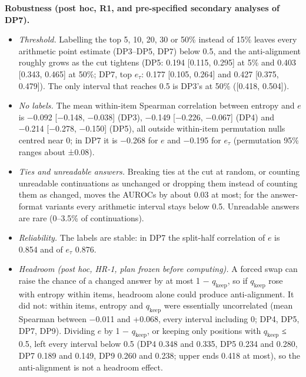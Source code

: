 \documentclass[
  10pt,
  a4paper,
]{article}
\providecommand{\tightlist}{%
  \setlength{\itemsep}{0pt}\setlength{\parskip}{0pt}}
\begin{document}
\textbf{Robustness (post hoc, R1, and pre-specified secondary analyses of DP7).}

\begin{itemize}
\tightlist
\item
  \emph{Threshold.} Labelling the top 5, 10, 20, 30 or 50\% instead of 15\% leaves every arithmetic point estimate (DP3--DP5, DP7) below 0.5, and the anti-alignment roughly grows as the cut tightens
  (DP5: 0.194 {[}0.115, 0.295{]} at 5\% and 0.403 {[}0.343, 0.465{]} at 50\%; DP7, top \(e_{\tau}\): 0.177 {[}0.105, 0.264{]} and 0.427 {[}0.375, 0.479{]}). The only interval that reaches 0.5 is DP3's
  at 50\% ({[}0.418, 0.504{]}).
\item
  \emph{No labels.} The mean within-item Spearman correlation between entropy and \(e\) is −0.092 {[}−0.148, −0.038{]} (DP3), −0.149 {[}−0.226, −0.067{]} (DP4) and −0.214 {[}−0.278, −0.150{]} (DP5),
  all outside within-item permutation nulls centred near 0; in DP7 it is −0.268 for \(e\) and −0.195 for \(e_{\tau}\) (permutation 95\% ranges about ±0.08).
\item
  \emph{Ties and unreadable answers.} Breaking ties at the cut at random, or counting unreadable continuations as unchanged or dropping them instead of counting them as changed, moves the AUROCs by
  about 0.03 at most; for the answer-format variants every arithmetic interval stays below 0.5. Unreadable answers are rare (0--3.5\% of continuations).
\item
  \emph{Reliability.} The labels are stable: in DP7 the split-half correlation of \(e\) is 0.854 and of \(e_{\tau}\) 0.876.
\item
  \emph{Headroom (post hoc, HR-1, plan frozen before computing).} A forced swap can raise the chance of a changed answer by at most 1 − \(q_{\mathrm{keep}}\), so if \(q_{\mathrm{keep}}\) rose with
  entropy within items, headroom alone could produce anti-alignment. It did not: within items, entropy and \(q_{\mathrm{keep}}\) were essentially uncorrelated (mean Spearman between −0.011 and +0.068,
  every interval including 0; DP4, DP5, DP7, DP9). Dividing \(e\) by 1 − \(q_{\mathrm{keep}}\), or keeping only positions with \(q_{\mathrm{keep}}\) ≤ 0.5, left every interval below 0.5 (DP4 0.348 and
  0.335, DP5 0.234 and 0.280, DP7 0.189 and 0.149, DP9 0.260 and 0.238; upper ends 0.418 at most), so the anti-alignment is not a headroom effect.
\end{itemize}
\end{document}
